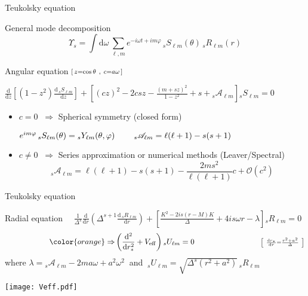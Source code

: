 \documentclass[9pt]{beamer}
\newcommand{\dd}{\mathrm{d}}
\begin{document}
\begin{frame}{Teukolsky equation}
	
	\begin{block}{General mode decomposition}
		$$\Upsilon_s = \int\dd\omega \,\sum_{\ell,m} e^{-i\omega t + i m \varphi} \, {}_{s}S_{\ell m}(\theta)\, {}_{s}R_{\ell m}(r)$$
	\end{block}

	\begin{block}{Angular equation $\hfill\scriptstyle [\, z = \cos\theta ~,~ c = a \omega \,]$}
		\begin{center}
			$\displaystyle \frac{\dd}{\dd z} \left[ (1-z^2) \frac{\dd\, {}_{s}S_{\ell m}}{\dd z} \right] + \left[ (c z)^2 - 2 c s z  -\frac{(m + s z)^2}{1 - z^2} + s + {}_{s}\mathscr{A}_{\ell m} \right] {}_{s}S_{\ell m} = 0 $
		\end{center}
		\begin{itemize}
			\setlength\itemsep{1em}
			\item $c=0$ $~\Rightarrow$ Spherical symmetry (closed form) 
			\begin{center}
				$ e^{i m \varphi} \,{}_{s}S_{\ell m}(\theta) = {}_{s}Y_{\ell m}(\theta,\varphi)
				\hspace*{0.8cm}{}_{s}\mathscr{A}_{\ell m} = \ell(\ell+1)-s(s+1)$
			\end{center}
			\item $c\ne0$ $~\Rightarrow$ Series approximation or numerical methods (Leaver/Spectral)
			$${}_{s}\mathscr{A}_{\ell m} = \ell(\ell+1) -s(s+1) - \frac{2 m s^2}{\ell(\ell+1)} c + \mathcal{O}(c^2)$$
		\end{itemize}
	\end{block}

\end{frame}


\begin{frame}{Teukolsky equation}
	
	\begin{block}{Radial equation $\quad \frac{1}{\Delta^s} \frac{\dd}{\dd r} \left( \Delta^{s+1} \frac{\dd\, {}_{s}R_{\ell m}}{\dd r} \right)
+ \left[ \frac{K^2 - 2 i s (r-M)K}{\Delta} + 4 i s \omega r -\lambda \right] {}_{s}R_{\ell m} = 0$}
		$$ \hspace*{2cm} {\color{orange}\Rightarrow} \left( \frac{\dd^2}{\dd r_{*}^2} + V_\mathrm{eff} \right) {}_{s}U_{\ell m} = 0 \hspace*{3cm} {\scriptstyle \left[~\frac{\dd r_*}{\dd r} = \frac{r^2+a^2}{\Delta}~\right] } $$
		where $\lambda = {}_{s}\mathscr{A}_{\ell m} - 2 m a \omega + a^2 \omega^2~$ and $~{}_{s}U_{\ell m}=\sqrt{\Delta^s (r^2 + a^2)} \,{}_{s}R_{\ell m}~$
		
		\texttt{[image: Veff.pdf]}
	\end{block}
	
\end{frame}
\end{document}
